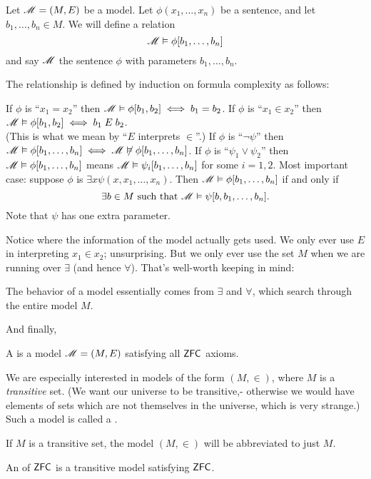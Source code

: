 \begin{definition}
	Let $\mathscr M=(M,E)$ be a model.
	Let $\phi(x_1, \dots, x_n)$ be a sentence, and let $b_1, \dots, b_n \in M$.
	We will define a relation
	\[ \mathscr M \vDash \phi[b_1, \dots, b_n] \]
	and say $\mathscr M$  the sentence $\phi$ with parameters $b_1, \dots, b_n$.

	The relationship is defined by induction on formula complexity as follows:
	\begin{itemize}
		\ii If $\phi$ is ``$x_1=x_2$'' then $\mathscr M \vDash \phi[b_1, b_2] \iff b_1 = b_2$.
		\ii If $\phi$ is ``$x_1\in x_2$'' then $\mathscr M \vDash \phi[b_1, b_2] \iff b_1 \; E \; b_2$. \\
		(This is what we mean by ``$E$ interprets $\in$''.)
		\ii If $\phi$ is ``$\neg \psi$'' then
		$\mathscr M \vDash \phi[b_1, \dots, b_n] \iff \mathscr M \not\vDash \phi[b_1, \dots, b_n]$.
		\ii If $\phi$ is ``$\psi_1 \lor \psi_2$'' then $\mathscr M \vDash \phi[b_1, \dots, b_n]$
		means $\mathscr M \vDash \psi_i[b_1, \dots, b_n]$ for some $i=1,2$.
		\ii Most important case: suppose $\phi$ is $\exists x \psi(x,x_1, \dots, x_n)$.
		Then $\mathscr M \vDash \phi[b_1, \dots, b_n]$ if and only if 
		\[ \exists b \in M \text{ such that } \mathscr M \vDash \psi[b, b_1, \dots, b_n]. \]
		Note that $\psi$ has one extra parameter.
	\end{itemize}
\end{definition}
Notice where the information of the model actually gets used.
We only ever use $E$ in interpreting $x_1 \in x_2$; unsurprising.
But we only ever use the set $M$ when we are running over $\exists$ (and hence $\forall$).
That's well-worth keeping in mind:
\begin{moral}
	The behavior of a model essentially comes from $\exists$ and $\forall$,
	which search through the entire model $M$.
\end{moral}

And finally,
\begin{definition}
	A  is a model $\mathscr M = (M,E)$ satisfying all $\mathsf{ZFC}$ axioms.
\end{definition}

We are especially interested in models of the form $(M, \in)$, where $M$ is a \emph{transitive} set.
(We want our universe to be transitive,-
otherwise we would have elements of sets which are not themselves
in the universe, which is very strange.)
Such a model is called a .
\begin{abuse}
	If $M$ is a transitive set, the model $(M, \in)$ will be abbreviated to just $M$.
\end{abuse}
\begin{definition}
	An  of $\mathsf{ZFC}$ is a transitive model satisfying $\mathsf{ZFC}$.
\end{definition}

